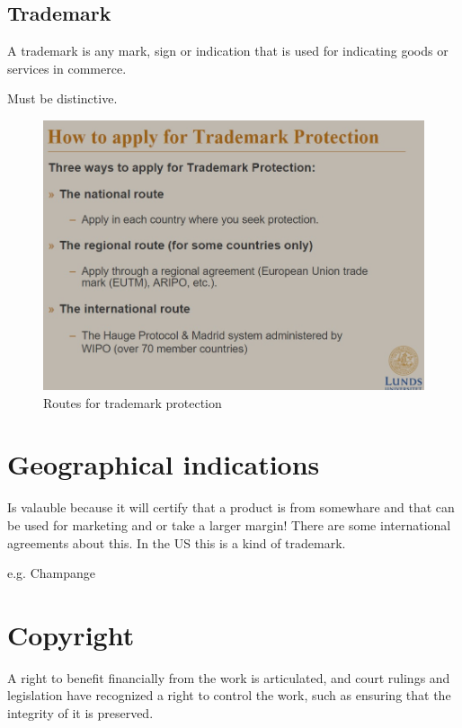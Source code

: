 \documentclass[12pt]{article} %
\begin{document}
\subsection{Trademark}

A trademark is any mark, sign or indication that is used for indicating goods or services in commerce. 

Must be distinctive.

\begin{figure}[]
    \centering
    \includegraphics[width=\textwidth]{trademark.jpg}
    \caption{Routes for trademark protection}
    \label{fig:trademark}
\end{figure}


\section{Geographical indications}

Is valauble because it will certify that a product is from somewhare and that can be used for marketing and or take a larger margin!
There are some international agreements about this. In the US this is a kind of trademark.

e.g. Champange

\section{Copyright}

A right to benefit financially from the work is articulated, and court rulings and legislation have recognized a right to control the work, such as ensuring that the integrity of it is preserved. 
\end{document}
